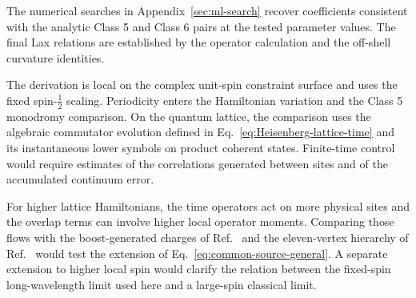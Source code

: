 The numerical searches in Appendix~\ref{sec:ml-search} recover coefficients
consistent with the analytic Class 5 and Class 6 pairs at the tested parameter
values.  The final Lax relations are established by the operator calculation
and the off-shell curvature identities.

The derivation is local on the complex unit-spin constraint surface and uses
the fixed spin-$\tfrac12$ scaling.  Periodicity enters the Hamiltonian
variation and the Class 5 monodromy comparison.  On the quantum lattice, the
comparison uses the algebraic commutator evolution defined in
Eq.~\eqref{eq:Heisenberg-lattice-time} and its instantaneous lower symbols on
product coherent states.  Finite-time control would require estimates of the
correlations generated between sites and of the accumulated continuum error.

For higher lattice Hamiltonians, the time operators act on more physical
sites and the overlap terms can involve higher local operator moments.
Comparing those flows with the boost-generated charges of
Ref.~\cite{deLeeuwFontanellaNietoGarcia2026} and the eleven-vertex hierarchy
of Ref.~\cite{LevinOlshanetskyZotov2014} would test the extension of
Eq.~\eqref{eq:common-source-general}.  A separate extension to higher local
spin would clarify the relation between the fixed-spin long-wavelength limit
used here and a large-spin classical limit.
